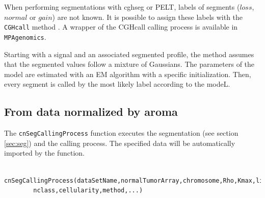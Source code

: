 \documentclass[a4paper,10pt]{article}
\begin{document}
  When performing segmentations with cghseg or PELT, labels of segments ($loss$, $normal$ or $gain$) are not known. It is possible to assign these labels with the \texttt{CGHcall} method \cite{CGHcall}. A wrapper of the CGHcall calling process is available in \texttt{MPAgenomics}.
	
	Starting with a signal and an associated segmented profile, the method assumes that the segmented values follow a mixture of Gaussians. The parameters of the model are estimated with an EM algorithm with a specific initialization. Then, every segment is called by the most likely label according to the modeL. 
	
	\subsection{From data normalized by aroma}	
		\label{segcalling}
		The \texttt{cnSegCallingProcess} function executes the segmentation (see section \ref{sec:seg}) and the calling process. The specified data will be automatically imported by the function.\\
			
		\begin{verbatim}	
		cnSegCallingProcess(dataSetName,normalTumorArray,chromosome,Rho,Kmax,listOfFile,onlySNP,savePlot,
		nclass,cellularity,method,...)
		\end{verbatim}
		
\end{document}
